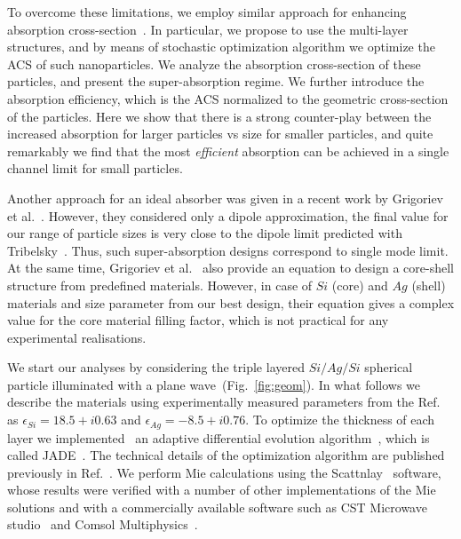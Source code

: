 \documentclass[aps,prl,twocolumn,showpacs,superscriptaddress,groupedaddress]{revtex4-1}
\begin{document}
To overcome these limitations, we employ similar approach for
enhancing absorption cross-section~\cite{Fan-2011}. In particular, we
propose to use the multi-layer structures, and by means of stochastic
optimization algorithm we optimize the ACS of such nanoparticles. We
analyze the absorption cross-section of these particles, and present
the super-absorption regime. We further introduce the absorption
efficiency, which is the ACS normalized to the geometric cross-section
of the particles. Here we show that there is a strong counter-play
between the increased absorption for larger particles vs size for
smaller particles, and quite remarkably we find that the most {\em
  efficient} absorption can be achieved in a single channel limit for
small particles.

Another approach for an ideal absorber was given in a recent work by
Grigoriev et al.~\cite{Grigoriev-2015}. However, they considered only
a dipole approximation, the final value for our range of particle
sizes is very close to the dipole limit predicted with
Tribelsky~\cite{Tribelsky-2011}.  Thus, such super-absorption designs
correspond to single mode limit.  At the same time, Grigoriev et
al.~\cite{Grigoriev-2015} also provide an equation to design a
core-shell structure from predefined materials. However, in case of
$Si$ (core) and $Ag$ (shell) materials and size parameter from our
best design, their equation gives a complex value for the core
material filling factor, which is not practical for any experimental
realisations.


\begin{figure}
\end{figure}


We start our analyses by considering the triple layered $Si/Ag/Si$
spherical particle illuminated with a plane
wave~(Fig.~\ref{fig:geom}). In what follows we describe the materials
using experimentally measured parameters from the
Ref.~\cite{palik-1997} as $\epsilon_{Si} = 18.5 + i0.63$ and
$\epsilon_{Ag} = -8.5 + i0.76$.  To optimize the thickness of each
layer we implemented~\cite{JADE-web} an adaptive differential
evolution algorithm~\cite{Storn-DE-first-1997}, which is called
JADE~\cite{Jingqiao-JADE-2009}.  The technical details of the
optimization algorithm are published previously in
Ref.~\cite{Ladutenko-2014}. We perform Mie calculations using the
Scattnlay~\cite{Pena-scattnlay-2009,Scattnlay-web} software, whose
results were verified with a number of other implementations of the
Mie solutions and with a commercially available software such as CST
Microwave studio~\cite{CST-web} and Comsol
Multiphysics~\cite{Comsol-web}.
\end{document}
